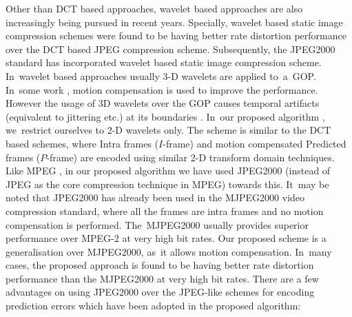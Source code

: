 \documentclass{doublecol-new}
\theoremstyle{TH}{
\newtheorem{lemma}{Lemma}[section]
\newtheorem{theorem}{Theorem}
\newtheorem{corrolary}{Corrolary}
\newtheorem{conjecture}[lemma]{Conjecture}
\newtheorem{proposition}[lemma]{Proposition}
\newtheorem{claim}[lemma]{Claim}
\newtheorem{stheorem}[lemma]{Wrong Theorem}
}
\theoremstyle{THrm}{
\newtheorem{definition}{Definition}[section]
\newtheorem{question}{Question}[section]
\newtheorem{remark}{Remark}[section]
\newtheorem{scheme}{Scheme}
}
\theoremstyle{THhit}{
\newtheorem{case}{Case}[section]
}
\begin{document}
Other than DCT based approaches, wavelet based approaches are also
increasingly being pursued in recent years. Specially, wavelet
\vadjust{\vspace*{-9pt}\pagebreak\vspace*{11.9pc}}based static image
compression schemes were found to be having better rate distortion
performance over the DCT based JPEG \citep{6} compression scheme.
Subsequently, the JPEG2000 \citep{7,8,9,10} standard has incorporated
wavelet based static image compression scheme. In~wavelet based approaches
usually 3-D wavelets \citep{11,12} are applied to~a~GOP. In~some work
\citep{13,14}, motion compensation is used to improve the performance.
However the usage of 3D wavelets over the GOP causes temporal artifacts
(equivalent to jittering etc.) at its boundaries \citep{15}. In~our
proposed algorithm \citep{16}, we~restrict ourselves to 2-D wavelets only.
The scheme is similar to the DCT based schemes, where Intra frames
($I$-frame) and motion compensated Predicted frames ($P$-frame) are
encoded using similar 2-D transform domain techniques. Like MPEG
\citep{17}, in our proposed algorithm we have used JPEG2000 (instead of
JPEG as the core compression technique in MPEG) towards this. It~may be
noted that JPEG2000 has already been used in the MJPEG2000 \citep{18}
video compression standard, where all the frames are intra frames and no
motion compensation is performed. The~MJPEG2000 usually provides superior
performance over MPEG-2 at very high bit rates. Our proposed scheme is a
generalisation over MJPEG2000, as~it allows motion compensation. In~many
cases, the proposed approach \citep{19} is found to be having better rate
distortion performance than the MJPEG2000 at very high bit rates. There
are a few advantages on using JPEG2000 over the JPEG-like schemes for
encoding prediction errors which have been adopted in the proposed
algorithm:
\end{document}
